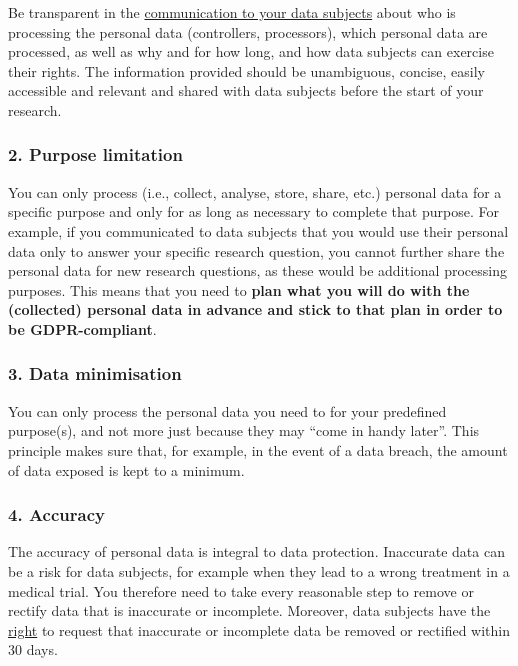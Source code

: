\documentclass[
]{book}
\begin{document}
Be transparent in the \protect\hyperlink{privacy-notices}{communication to your data subjects}
about who is processing the personal data (controllers, processors), which
personal data are processed, as well as why and for how long, and how data
subjects can exercise their rights. The information provided should be
unambiguous, concise, easily accessible and relevant and shared with data
subjects before the start of your research.

\hypertarget{purpose-limitation}{%
\subsubsection{2. Purpose limitation}\label{purpose-limitation}}

You can only process (i.e., collect, analyse, store, share, etc.) personal data
for a specific purpose and only for as long as necessary to complete that purpose.
For example, if you communicated to data subjects that you would use their
personal data only to answer your specific research question, you cannot further
share the personal data for new research questions, as these would be additional
processing purposes. This means that you need to \textbf{plan what you will do with
the (collected) personal data in advance and stick to that plan in order to be
GDPR-compliant}.

\hypertarget{data-minimisation}{%
\subsubsection{3. Data minimisation}\label{data-minimisation}}

You can only process the personal data you need to for your predefined purpose(s),
and not more just because they may ``come in handy later''. This principle makes
sure that, for example, in the event of a data breach, the amount of data exposed
is kept to a minimum.

\hypertarget{accuracy}{%
\subsubsection{4. Accuracy}\label{accuracy}}

The accuracy of personal data is integral to data protection. Inaccurate data
can be a risk for data subjects, for example when they lead to a wrong treatment
in a medical trial. You therefore need to take every reasonable step to remove
or rectify data that is inaccurate or incomplete. Moreover, data subjects have
the \protect\hyperlink{data-subject-rights}{right} to request that inaccurate or
incomplete data be removed or rectified within 30 days.
\end{document}
